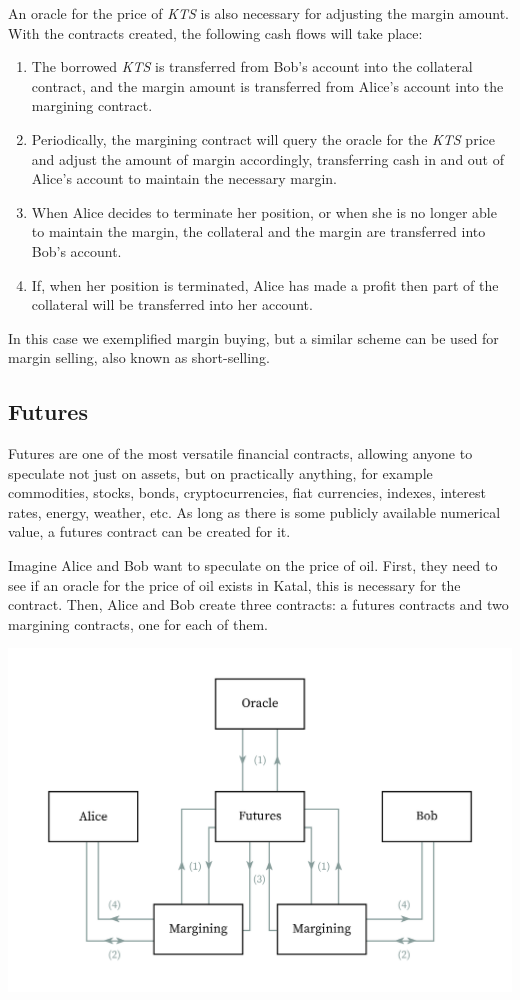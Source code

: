 \documentclass[conference]{IEEEtran}
\begin{document}
An oracle for the price of \textit{KTS} is also necessary for adjusting the margin amount. With the contracts created, the following cash flows will take place:

\begin{enumerate}
	\item The borrowed \textit{KTS} is transferred from Bob's account into the collateral contract, and the margin amount is transferred from Alice's account into the margining contract.
	\item Periodically, the margining contract will query the oracle for the \textit{KTS} price and adjust the amount of margin accordingly, transferring cash in and out of Alice's account to maintain the necessary margin.
	\item When Alice decides to terminate her position, or when she is no longer able to maintain the margin, the collateral and the margin are transferred into Bob's account.
	\item If, when her position is terminated, Alice has made a profit then part of the collateral will be transferred into her account.
\end{enumerate}

In this case we exemplified margin buying, but a similar scheme can be used for margin selling, also known as short-selling.

\subsection{Futures}
Futures are one of the most versatile financial contracts, allowing anyone to speculate not just on assets, but on practically anything, for example commodities, stocks, bonds, cryptocurrencies, fiat currencies, indexes, interest rates, energy, weather, etc. As long as there is some publicly available numerical value, a futures contract can be created for it.

Imagine Alice and Bob want to speculate on the price of oil. First, they need to see if an oracle for the price of oil exists in Katal, this is necessary for the contract. Then, Alice and Bob create three contracts: a futures contracts and two margining contracts, one for each of them.

\includegraphics[width=\linewidth]{images/futures.jpg}
\end{document}

